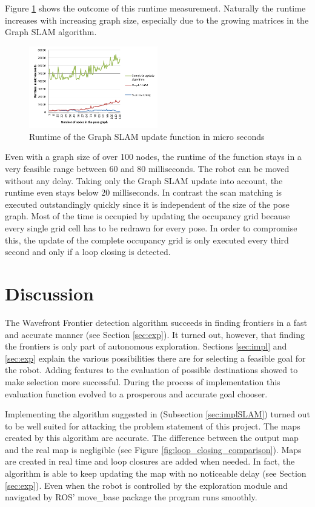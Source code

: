 \documentclass{ba-kecs}
\begin{document}
Figure \ref{fig:runtime} shows the outcome of this runtime measurement. Naturally the runtime increases with increasing graph size, especially due to the growing matrices in the Graph SLAM algorithm.

\begin{figure}[htbp]
	\centering
		\includegraphics[width=0.50\textwidth]{figures/Runtime.png}
	\caption{Runtime of the Graph SLAM update function in micro seconds}
	\label{fig:runtime}
\end{figure}

Even with a graph size of over 100 nodes, the runtime of the function stays in a very feasible range between 60 and 80 milliseconds. The robot can be moved without any delay. Taking only the Graph SLAM update into account, the runtime even stays below 20 milliseconds. In contrast the scan matching is executed outstandingly quickly since it is independent of the size of the pose graph. Most of the time is occupied by updating the occupancy grid because every single grid cell has to be redrawn for every pose. In order to compromise this, the update of the complete occupancy grid is only executed every third second and only if a loop closing is detected.

\section{Discussion}
\label{sec:disc}
The Wavefront Frontier detection algorithm \citep{Keidar} succeeds in finding frontiers in a fast and accurate manner (see Section \ref{sec:exp}). It turned out, however, that finding the frontiers is only part of autonomous exploration. Sections \ref{sec:impl} and \ref{sec:exp} explain the various possibilities there are for selecting a feasible goal for the robot. Adding features to the evaluation of possible destinations showed to make selection more successful. During the process of implementation this evaluation function evolved to a prosperous and accurate goal chooser.

Implementing the algorithm suggested in \citep{Grisetti} (Subsection \ref{sec:implSLAM}) turned out to be well suited for attacking the problem statement of this project. The maps created by this algorithm are accurate. The difference between the output map and the real map is negligible (see Figure \ref{fig:loop_closing_comparison}). Maps are created in real time and loop closures are added when needed. In fact, the algorithm is able to keep updating the map with no noticeable delay (see Section \ref{sec:exp}). Even when the robot is controlled by the exploration module and navigated by ROS' move\_base package the program runs smoothly.
\end{document}
